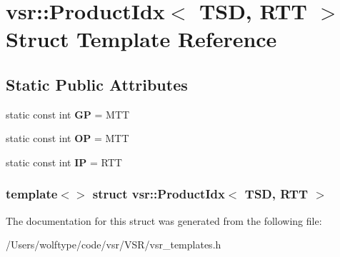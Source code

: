 \hypertarget{structvsr_1_1_product_idx_3_01_t_s_d_00_01_r_t_t_01_4}{\section{vsr\-:\-:Product\-Idx$<$ T\-S\-D, R\-T\-T $>$ Struct Template Reference}
\label{structvsr_1_1_product_idx_3_01_t_s_d_00_01_r_t_t_01_4}
}
\subsection*{Static Public Attributes}
\begin{DoxyCompactItemize}
\item 
\hypertarget{structvsr_1_1_product_idx_3_01_t_s_d_00_01_r_t_t_01_4_a6097ac7dc34a1d71b27dc05b5f2f9c1b}{static const int {\bfseries G\-P} = M\-T\-T}\label{structvsr_1_1_product_idx_3_01_t_s_d_00_01_r_t_t_01_4_a6097ac7dc34a1d71b27dc05b5f2f9c1b}

\item 
\hypertarget{structvsr_1_1_product_idx_3_01_t_s_d_00_01_r_t_t_01_4_a3dbe5ca89130bc8bfb7eafec9b65a1ce}{static const int {\bfseries O\-P} = M\-T\-T}\label{structvsr_1_1_product_idx_3_01_t_s_d_00_01_r_t_t_01_4_a3dbe5ca89130bc8bfb7eafec9b65a1ce}

\item 
\hypertarget{structvsr_1_1_product_idx_3_01_t_s_d_00_01_r_t_t_01_4_ab6fe14c9c4182c3058396d5c55a225d3}{static const int {\bfseries I\-P} = R\-T\-T}\label{structvsr_1_1_product_idx_3_01_t_s_d_00_01_r_t_t_01_4_ab6fe14c9c4182c3058396d5c55a225d3}

\end{DoxyCompactItemize}
\subsubsection*{template$<$$>$ struct vsr\-::\-Product\-Idx$<$ T\-S\-D, R\-T\-T $>$}



The documentation for this struct was generated from the following file\-:\begin{DoxyCompactItemize}
\item 
/\-Users/wolftype/code/vsr/\-V\-S\-R/vsr\-\_\-templates.\-h\end{DoxyCompactItemize}
